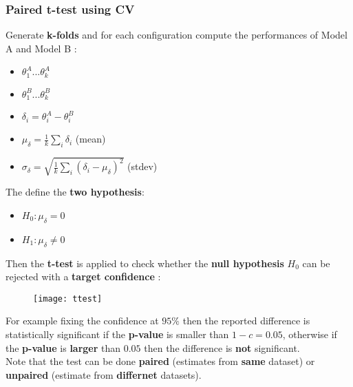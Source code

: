 \subsubsection{Paired t-test using CV}
Generate \textbf{k-folds} and for each configuration compute the performances of Model A and Model B :
\begin{itemize}
\item $\theta^A_1 ... \theta^A_k$
\item $\theta^B_1 ... \theta^B_k$
\item $\delta_i = \theta^A_i - \theta^B_i$
\item $\mu_{\delta} =\frac{1}{k} \sum \limits_{i} \delta_i$ (mean)
\item $\sigma_{\delta} = \sqrt{\frac{1}{k} \sum \limits_{i}(\delta_i - \mu_{\delta})^2 }$ (stdev) 
\end{itemize}
The define the \textbf{two hypothesis}:
\begin{itemize}
\item $H_0 : \mu_{\delta} =0$
\item $H_1 : \mu_{\delta} \neq 0$
\end{itemize}
Then the \textbf{t-test} is applied to check whether the \textbf{null hypothesis} $H_0$ can be rejected with a \textbf{target confidence} :
\begin{figure}[H]
  \centering
  \texttt{[image: ttest]}
\end{figure}
For example fixing the confidence at $95\%$ then the reported difference is statistically significant if the \textbf{p-value} is smaller than $1-c = 0.05$, otherwise if the \textbf{p-value } is \textbf{larger} than $0.05$ then the difference is \textbf{not } significant.\\
Note that the test can be done \textbf{paired} (estimates from \textbf{same} dataset) or \textbf{unpaired} (estimate from \textbf{differnet} datasets).



